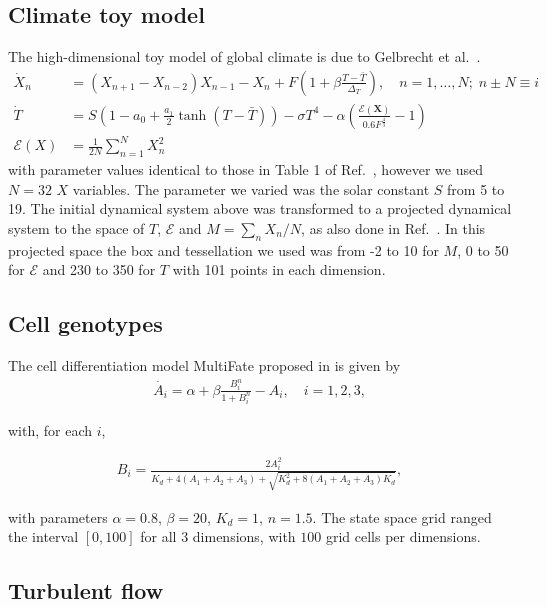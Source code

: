 \documentclass[9pt,twoside,lineno]{pnas-new}
\begin{document}
\subsection*{Climate toy model} The high-dimensional toy model of global climate is due to Gelbrecht et al.~\cite{Gelbrecht2021}. 
\begin{align*}
    \dot{X}_n &= (X_{n+1} - X_{n-2})X_{n-1} - X_n + F \left(1 + \beta \frac{T - \bar{T}}{\Delta_T}\right) , \quad n = 1, \dots, N; \; n\pm N \equiv i \\ 
    \dot{T} &= S\left(1 - a_0 + \frac{a_1}{2}\tanh \left( T - \bar{T}\right)\right) - \sigma T^4 - \alpha\left( \frac{\mathcal{E} (\mathbf{X})}{0.6 F^{\tfrac{4}{3}}} - 1 \right) \\
    \mathcal{E}(X) &= \frac{1}{2N}\sum_{n=1}^{N}X_n^2
\end{align*}
with parameter values identical to those in Table 1 of Ref.~\cite{Gelbrecht2021}, however we used $N=32$ $X$ variables. The parameter we varied was the solar constant $S$ from 5 to 19. The initial dynamical system above was transformed to a projected dynamical system to the space of $T$, $\mathcal{E}$ and $M = \sum_n X_{n}/N$, as also done in Ref.~\cite{Gelbrecht2021}. In this projected space the box and tessellation we used was from -2 to 10 for $M$, 0 to 50 for $\mathcal{E}$ and 230 to 350 for $T$ with 101 points in each dimension.



\subsection*{Cell genotypes}
The cell differentiation model MultiFate proposed in \cite{zhu2022synthetic} is given by 
\begin{align*}
    \dot{A_i} = \alpha + \beta \frac{ B_i^n }{ 1 + B_i^n } - A_i, \quad i = 1, 2, 3, 
\end{align*}

with, for each $i$,

\begin{align*}
    B_i = \frac{2A_i^2}{ K_d + 4(A_1 + A_2 + A_3) + \sqrt{ K_d^2 + 8(A_1 + A_2 + A_3) K_d } }, 
\end{align*}

with parameters $\alpha = 0.8$, $\beta = 20$, $K_d = 1$, $n = 1.5$. 
The state space grid ranged the interval $[0, 100]$ for all $3$ dimensions, with $100$ grid cells per dimensions.

\subsection*{Turbulent flow}
\end{document}

